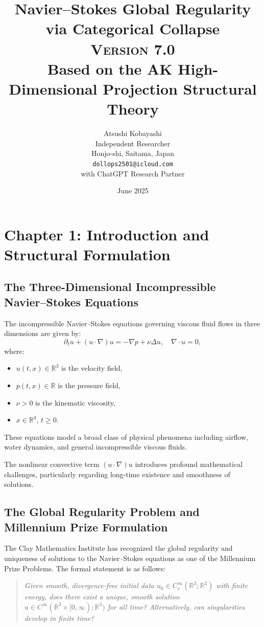 \documentclass[11pt]{article}
\title{Navier–Stokes Global Regularity via Categorical Collapse\\
\Large \textsc{Version 7.0}\\
\small Based on the AK High-Dimensional Projection Structural Theory}
\author{Atsushi Kobayashi\\
Independent Researcher\\
Honjo-shi, Saitama, Japan\\
\small \texttt{dollops2501@icloud.com}\\
\small with ChatGPT Research Partner}
\date{June 2025}
\begin{document}
\maketitle



\section{Chapter 1: Introduction and Structural Formulation}

\subsection{The Three-Dimensional Incompressible Navier–Stokes Equations}

The incompressible Navier–Stokes equations governing viscous fluid flows in three dimensions are given by:
\[
\partial_t u + (u \cdot \nabla)u = -\nabla p + \nu \Delta u, \quad \nabla \cdot u = 0,
\]
where:
\begin{itemize}
  \item \( u(t,x) \in \mathbb{R}^3 \) is the velocity field,
  \item \( p(t,x) \in \mathbb{R} \) is the pressure field,
  \item \( \nu > 0 \) is the kinematic viscosity,
  \item \( x \in \mathbb{R}^3 \), \( t \geq 0 \).
\end{itemize}

These equations model a broad class of physical phenomena including airflow, water dynamics, and general incompressible viscous fluids.

The nonlinear convective term \( (u \cdot \nabla)u \) introduces profound mathematical challenges, particularly regarding long-time existence and smoothness of solutions.

\subsection{The Global Regularity Problem and Millennium Prize Formulation}

The Clay Mathematics Institute has recognized the global regularity and uniqueness of solutions to the Navier–Stokes equations as one of the Millennium Prize Problems. The formal statement is as follows:

\begin{quote}
\textit{Given smooth, divergence-free initial data \( u_0 \in C^\infty_c(\mathbb{R}^3; \mathbb{R}^3) \) with finite energy, does there exist a unique, smooth solution \( u \in C^\infty(\mathbb{R}^3 \times [0, \infty); \mathbb{R}^3) \) for all time? Alternatively, can singularities develop in finite time?}
\end{quote}
\end{document}
